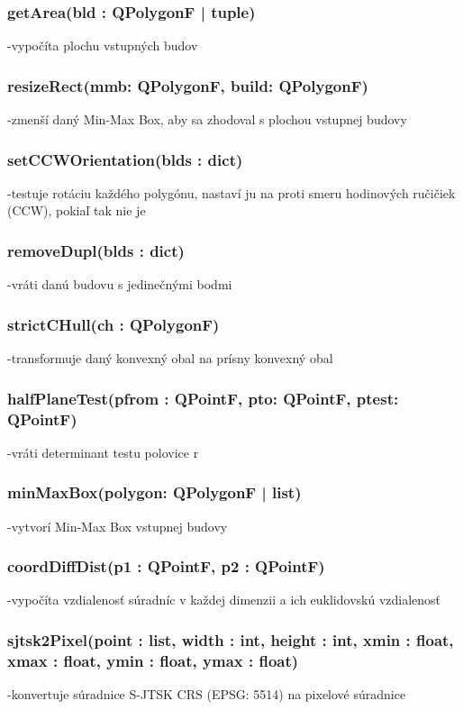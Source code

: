 \documentclass[12pt]{article}
\begin{document}
\subsubsection*{getArea(bld : QPolygonF | tuple)}
\noindent-vypočíta plochu vstupných budov
\subsubsection*{resizeRect(mmb: QPolygonF, build: QPolygonF)}
\noindent-zmenší daný Min-Max Box, aby sa zhodoval s plochou vstupnej budovy
\subsubsection*{setCCW\textunderscore Orientation(blds : dict)}
\noindent-testuje rotáciu každého polygónu, nastaví ju na proti smeru hodinových ručičiek (CCW), pokiaľ tak nie je
\subsubsection*{removeDupl(blds : dict)}
\noindent-vráti danú budovu s jedinečnými bodmi
\subsubsection*{strictC\textunderscore Hull(ch : QPolygonF)}
\noindent-transformuje daný konvexný obal na prísny konvexný obal
\subsubsection*{halfPlaneTest(p\textunderscore from : QPointF, p\textunderscore to: QPointF, p\textunderscore test: QPointF)}
\noindent-vráti determinant testu polovice r

\subsubsection*{minMaxBox(polygon: QPolygonF | list)}
\noindent-vytvorí Min-Max Box vstupnej budovy
\subsubsection*{coordDiffDist(p1 : QPointF, p2 : QPointF)}
\noindent-vypočíta vzdialenosť súradníc v každej dimenzii a ich euklidovskú vzdialenosť
\subsubsection*{sjtsk2Pixel(point : list, width : int, height : int, x\textunderscore min : float, x\textunderscore max : float, y\textunderscore min : float, y\textunderscore max : float)}
\noindent-konvertuje súradnice S-JTSK CRS (EPSG: 5514) na pixelové súradnice
\end{document}
